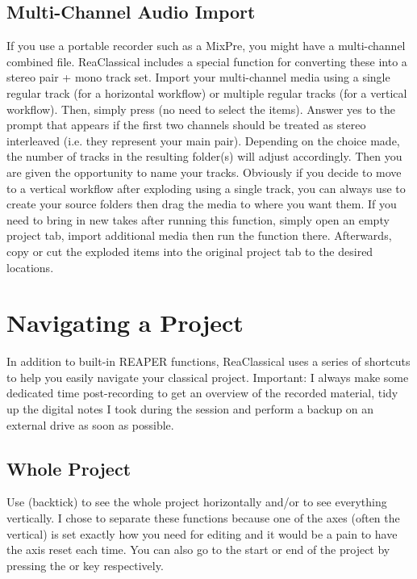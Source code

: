 \documentclass[10pt,american]{article}
\begin{document}
\subsection{Multi-Channel Audio Import}

If you use a portable recorder such as a MixPre, you might have a multi-channel
combined file. ReaClassical includes a special function for converting these
into a stereo pair + mono track set. Import your multi-channel media using a
single regular track (for a horizontal workflow) or multiple regular tracks (for
a vertical workflow). Then, simply press  (no need to select the
items). Answer yes to the prompt that appears if the first two channels should
be treated as stereo interleaved (i.e. they represent your main pair). Depending
on the choice made, the number of tracks in the resulting folder(s) will adjust
accordingly. Then you are given the opportunity to name your tracks. Obviously
if you decide to move to a vertical workflow after exploding using a single
track, you can always use  to create your source folders then drag the
media to where you want them. If you need to bring in new takes after running
this function, simply open an empty project tab, import additional media then
run the function there. Afterwards, copy or cut the exploded items into the
original project tab to the desired locations.

\section{Navigating a Project}

In addition to built-in REAPER functions, ReaClassical uses a series of
shortcuts to help you easily navigate your classical project. Important: I
always make some dedicated time post-recording to get an overview of the
recorded material, tidy up the digital notes I took during the session and
perform a backup on an external drive as soon as possible.

\subsection{Whole Project}

Use  (backtick) to see the whole project horizontally and/or
 to see everything vertically. I chose to separate these functions
because one of the axes (often the vertical) is set exactly how you need for
editing and it would be a pain to have the axis reset each time. You can also go
to the start or end of the project by pressing the  or  key
respectively. 
\end{document}
